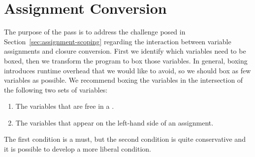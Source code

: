 \documentclass[7x10,nocrop]{TimesAPriori_MIT}%
\begin{document}
\section{Assignment Conversion}
\label{sec:convert-assignments}

The purpose of the  pass is to address the
challenge posed in Section~\ref{sec:assignment-scoping} regarding the
interaction between variable assignments and closure conversion.
First we identify which variables need to be boxed, then we transform
the program to box those variables. In general, boxing introduces
runtime overhead that we would like to avoid, so we should box as few
variables as possible. We recommend boxing the variables in the
intersection of the following two sets of variables:
\begin{enumerate}
\item The variables that are free in a .
\item The variables that appear on the left-hand side of an
  assignment.
\end{enumerate}
The first condition is a must, but the second condition is quite conservative and it is possible to
develop a more liberal condition. 
\end{document}
